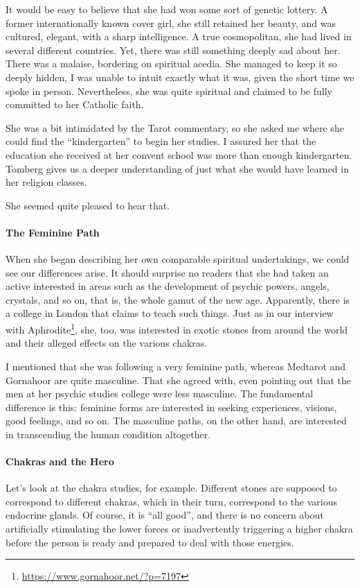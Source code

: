 It would be easy to believe that she had won some sort of genetic lottery. A former internationally known cover girl, she still retained her beauty, and was cultured, elegant, with a sharp intelligence. A true cosmopolitan, she had lived in several different countries. Yet, there was still something deeply sad about her. There was a malaise, bordering on spiritual acedia. She managed to keep it so deeply hidden, I was unable to intuit exactly what it was, given the short time we spoke in person. Nevertheless, she was quite spiritual and claimed to be fully committed to her Catholic faith.

She was a bit intimidated by the Tarot commentary, so she asked me where she could find the “kindergarten” to begin her studies. I assured her that the education she received at her convent school was more than enough kindergarten. Tomberg gives us a deeper understanding of just what she would have learned in her religion classes.

She seemed quite pleased to hear that.

\paragraph{The Feminine Path}
When she began describing her own comparable spiritual undertakings, we could see our differences arise. It should surprise no readers that she had taken an active interested in areas such as the development of psychic powers, angels, crystals, and so on, that is, the whole gamut of the new age. Apparently, there is a college in London that claims to teach such things. Just as in our interview with Aphrodite\footnote{\url{https://www.gornahoor.net/?p=7197}}, she, too, was interested in exotic stones from around the world and their alleged effects on the various chakras.

I mentioned that she was following a very feminine path, whereas Medtarot and Gornahoor are quite masculine. That she agreed with, even pointing out that the men at her psychic studies college were less masculine. The fundamental difference is this: feminine forms are interested in seeking experiences, visions, good feelings, and so on. The masculine paths, on the other hand, are interested in transcending the human condition altogether.

\paragraph{Chakras and the Hero}
Let's look at the chakra studies, for example. Different stones are supposed to correspond to different chakras, which in their turn, correspond to the various endocrine glands. Of course, it is “all good”, and there is no concern about artificially stimulating the lower forces or inadvertently triggering a higher chakra before the person is ready and prepared to deal with those energies.

